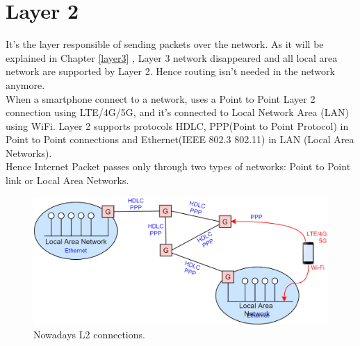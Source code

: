 \chapter{Layer 2}
It's the layer responsible of sending packets over the network. As it will be explained in Chapter \ref{layer3} , Layer 3 network disappeared and all local area network are supported by Layer 2. Hence routing isn't needed in the network anymore.\\
When a smartphone connect to a network, uses a Point to Point Layer 2 connection using LTE/4G/5G, and it's connected to Local Network Area (LAN) using WiFi. Layer 2 supports protocols HDLC, PPP(Point to Point Protocol) in Point to Point connections and Ethernet(IEEE 802.3 802.11) in LAN (Local Area Networks).\\
Hence Internet Packet passes only through two types of networks: Point to Point link or Local Area Networks.
\begin{figure}[h]
\centering
\includegraphics[scale=0.4]{Images/Layer2/layer2}
\caption{\footnotesize{Nowadays L2 connections.}}\label{layer2}
\end{figure}

